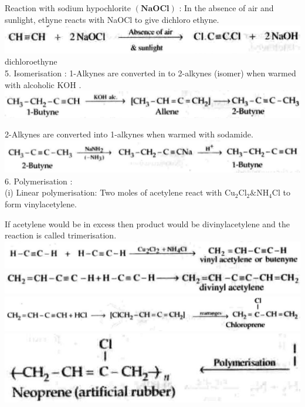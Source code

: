 \documentclass[10pt]{article}
\begin{document}
Reaction with sodium hypochlorite $(\mathbf{N a O C l})$ : In the absence of air and sunlight, ethyne reacts with NaOCl to give dichloro ethyne.\\
\includegraphics[max width=\textwidth, center]{2025_01_28_8470952b98110cec3aabg-193(3)}\\
dichloroethyne\\
5. Isomerisation : 1-Alkynes are converted in to 2-alkynes (isomer) when warmed with alcoholic KOH .\\
\includegraphics[max width=\textwidth, center]{2025_01_28_8470952b98110cec3aabg-193(1)}

2-Alkynes are converted into 1-alkynes when warmed with sodamide.\\
\includegraphics[max width=\textwidth, center]{2025_01_28_8470952b98110cec3aabg-193(5)}\\
6. Polymerisation :\\
(i) Linear polymerisation: Two moles of acetylene react with $\mathrm{Cu}_{2} \mathrm{Cl}_{2} \& \mathrm{NH}_{4} \mathrm{Cl}$ to form vinylacetylene.

If acetylene would be in excess then product would be divinylacetylene and the reaction is called trimerisation.\\
\includegraphics[max width=\textwidth, center]{2025_01_28_8470952b98110cec3aabg-193(4)}\\
\includegraphics[max width=\textwidth, center]{2025_01_28_8470952b98110cec3aabg-193}\\
\includegraphics[max width=\textwidth, center]{2025_01_28_8470952b98110cec3aabg-193(6)}\\
\includegraphics[max width=\textwidth, center]{2025_01_28_8470952b98110cec3aabg-193(2)}
\end{document}
